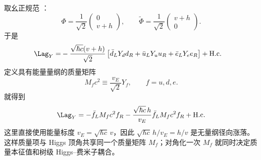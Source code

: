 \begin{definition}[真空产生的质量矩阵]
取幺正规范 ：
\begin{equation*}
 \Phi=\frac1{\sqrt2}\begin{pmatrix}0\\v+h\end{pmatrix},
 \qquad
 \widetilde\Phi=\frac1{\sqrt2}\begin{pmatrix}v+h\\0\end{pmatrix}.
\end{equation*}
于是
\begin{align*}
 \Lag_Y
 =&-\frac{\sqrt{\hbar c}(v+h)}{\sqrt2}
 \left[
 \bar d_LY_dd_R+\bar u_LY_uu_R+\bar e_LY_ee_R
 \right]+\mathrm{H.c.}
\end{align*}
定义具有能量量纲的质量矩阵
\begin{equation}
 {
 M_f c^2\equiv\frac{v_E}{\sqrt2}Y_f,
 \qquad f=u,d,e.}
 \label{eq:sm-mass-matrix-yukawa-dp11}
\end{equation}
就得到
\begin{equation}
 \Lag_Y
 =-\bar f_LM_fc^2f_R
 -\frac{\sqrt{\hbar c}\,h}{v_E}
 \bar f_LM_fc^2 f_R+\mathrm{H.c.}
 \label{eq:yukawa-mass-higgs-before-diag-dp11}
\end{equation}
这里直接使用能量标度 $v_E=\sqrt{\hbar c}\,v$，因此 $\sqrt{\hbar c}\,h/v_E=h/v$ 是无量纲径向涨落。这样质量项与 Higgs 顶角共享同一个质量矩阵 $M_f$；对角化一次 $M_f$ 就同时决定质量本征值和树级 Higgs--费米子耦合。
\end{definition}

